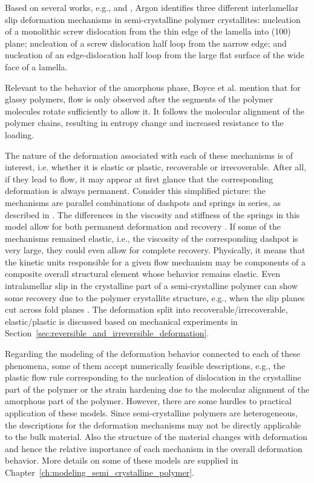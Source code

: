 Based on several works, e.g., \cite{petersonThermalInitiationScrew1966} and \cite{linRateMechanismPlasticity1994}, Argon \citep{argonPhysicsDeformationFracture2013a} identifies three different interlamellar slip deformation mechanisms in semi-crystalline polymer crystallites: nucleation of a monolithic screw dislocation from the thin edge of the lamella into (100) plane; nucleation of a screw dislocation half loop from the narrow edge; and nucleation of an edge-dislocation half loop from the large flat surface of the wide face of a lamella.

Relevant to the behavior of the amorphous phase, Boyce et al. \citep{boyceLargeInelasticDeformation1988} mention that for glassy polymers, flow is only observed after the segments of the polymer molecules rotate sufficiently to allow it.
It follows the molecular alignment of the polymer chains, resulting in entropy change and increased resistance to the loading.

The nature of the deformation associated with each of these mechanisms is of interest, i.e. whether it is elastic or plastic, recoverable or irrecoverable.
After all, if they lead to flow, it may appear at first glance that the corresponding deformation is always permanent.
Consider this simplified picture: the mechanisms are parallel combinations of dashpots and springs in series, as described in \cite{kellerIdentificationStructuralProcesses1971}.
The differences in the viscosity and stiffness of the springs in this model allow for both permanent deformation and recovery \citep{fotheringhamRoleRecoveryForces1978}.
If some of the mechanisms remained elastic, i.e., the viscosity of the corresponding dashpot is very large, they could even allow for complete recovery.
Physically, it means that the kinetic units responsible for a given flow mechanism may be components of a composite overall structural element whose behavior remains elastic.
Even intralamellar slip in the crystalline part of a semi-crystalline polymer can show some recovery due to the polymer crystallite structure, e.g., when the slip planes cut across fold planes \citep{kellerIdentificationStructuralProcesses1971}.
The deformation split into recoverable/irrecoverable, elastic/plastic is discussed based on mechanical experiments in Section~\ref{sec:reversible_and_irreversible_deformation}.

Regarding the modeling of the deformation behavior connected to each of these phenomena, some of them accept numerically feasible descriptions, e.g., the plastic flow rule corresponding to the nucleation of dislocation in the crystalline part of the polymer or the strain hardening due to the molecular alignment of the amorphous part of the polymer.
However, there are some hurdles to practical application of these models.
Since semi-crystalline polymers are heterogeneous, the descriptions for the deformation mechanisms may not be directly applicable to the bulk material.
Also the structure of the material changes with deformation and hence the relative importance of each mechanism in the overall deformation behavior.
More details on some of these models are supplied in Chapter~\ref{ch:modeling_semi_crystalline_polymer}.

